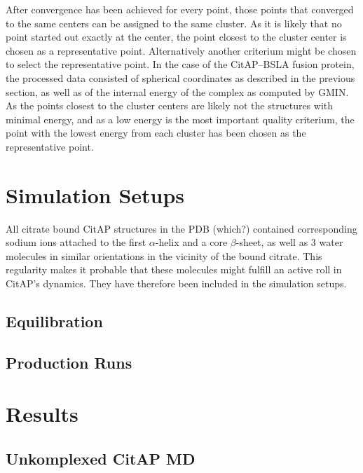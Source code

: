 \documentclass[english, a4paper, 12pt, titlepage, draft]{article}
\begin{document}
After convergence has been achieved for every point, those points that converged to the same centers can be assigned to the same cluster.
As it is likely that no point started out exactly at the center, the point closest to the cluster center is chosen as a representative point.
Alternatively another criterium might be chosen to select the representative point.
In the case of the CitAP--BSLA fusion protein, the processed data consisted of spherical coordinates as described in the previous section, as well as of the internal energy of the complex as computed by GMIN.
As the points closest to the cluster centers are likely not the structures with minimal energy, and as a low energy is the most important quality criterium, the point with the lowest energy from each cluster has been chosen as the representative point.



\section{Simulation Setups}

All citrate bound CitAP structures in the PDB (which?) contained corresponding sodium ions attached to the first $\alpha$-helix and a core $\beta$-sheet, as well as 3 water molecules in similar orientations in the vicinity of the bound citrate.
This regularity makes it probable that these molecules might fulfill an active roll in CitAP's dynamics.
They have therefore been included in the simulation setups.

\subsection{Equilibration}




\subsection{Production Runs}



\section{Results}

\subsection{Unkomplexed CitAP MD}
\end{document}
